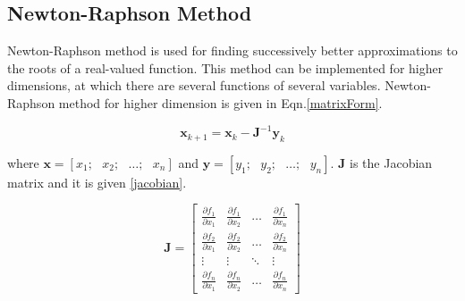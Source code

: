 \subsection*{Newton-Raphson Method}

Newton-Raphson method is used for finding successively better approximations to the roots of a real-valued function. This method can be implemented for higher dimensions, at which there are several functions of several variables.  Newton-Raphson method for higher dimension is given in Eqn.\eqref{matrixForm}.

\begin{equation} \label{matrixForm}
\mathbf{x}_{k+1}=\mathbf{x}_{k}-\mathbf{J}^{-1}\mathbf{y}_{k}
\end{equation}


where $\mathbf{x}=[x_1;\text{ }x_2;\text{ }\dots;\text{ }x_n]$ and $\mathbf{y}=[y_1;\text{ }y_2;\text{ }\dots;\text{ }y_n]$. $\mathbf{J}$ is the Jacobian matrix and it is given \eqref{jacobian}.


\begin{equation} \label{jacobian}
\mathbf{J}=
\begin{bmatrix}
\frac{\partial f_1}{\partial x_1} &
\frac{\partial f_1}{\partial x_2} &
\dots &
\frac{\partial f_1}{\partial x_n} \\[0.4em]
\frac{\partial f_2}{\partial x_1} &
\frac{\partial f_2}{\partial x_2} &
\dots &
\frac{\partial f_2}{\partial x_n} \\[0.2em]
\vdots &
\vdots &
\ddots &
\vdots \\[0.2em]
\frac{\partial f_n}{\partial x_1} &
\frac{\partial f_n}{\partial x_2} &
\dots &
\frac{\partial f_n}{\partial x_n}
\end{bmatrix}
\end{equation}
